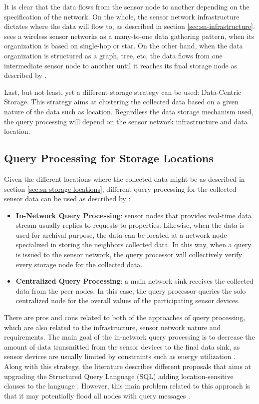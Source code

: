 It is clear that the data flows from the sensor node to another depending on
the specification of the network. On the whole, the sensor network
infrastructure dictates where the data will flow to, as described in section
\ref{sec:sn-infrastructure}. \cite{sn-storage02} sees a wireless sensor
networks as a many-to-one data gathering pattern, when its organization is
based on single-hop or star. On the other hand, when the data organization is
structured as a graph, tree, etc, the data flows from one intermediate sensor
node to another until it reaches its final storage node as described by
\cite{sn-storage01} \cite{sn-storage03}. 

Last, but not least, yet a different storage strategy can be used: Data-Centric
Storage. This strategy aims at clustering the collected data based on a given nature of the
data such as location. Regardless the data storage mechanism used, the query
processing will depend on the sensor network infrastructure and data location.

\subsection{Query Processing for Storage Locations}
\label{sec:query-process}

Given the different locations where the collected data might be as described in
section \ref{sec:sn-storage-locations}, different query processing for the
collected sensor data can be used as described by \cite{sn-storage03}:

\begin{itemize}
  \item \textbf{In-Network Query Processing}: sensor nodes that provides
  real-time data stream usually replies to requests to properties. Likewise, when the
  data is used for archival purpose, the data can be located at a network node
  specialized in storing the neighbors collected data. In this way, when a
  query is issued to the sensor network, the query processor will
  collectively verify every storage node for the collected data.
  \item \textbf{Centralized Query Processing}: a main network sink receives the
  collected data from the peer nodes. In this case, the query processor queries
  the solo centralized node for the overall values of the participating sensor
  devices.
\end{itemize}

There are pros and cons related to both of the approaches of query processing,
which are also related to the infrastructure, sensor network nature and 
requirements. The main goal of the in-network query processing is to decrease
the amount of data transmitted from the sensor devices to the final data sink, as
sensor devices are usually limited by constraints such as energy utilization 
\cite{sn-storage03}. Along with this strategy, the literature describes
different proposals that aims at upgrading the Structured Query Language (SQL)
adding location-sensitive clauses to the language \cite{sn-db-newop}. However,
this main problem related to this approach is that it may potentially flood
all nodes with query messages \cite{sn-storage04}.

